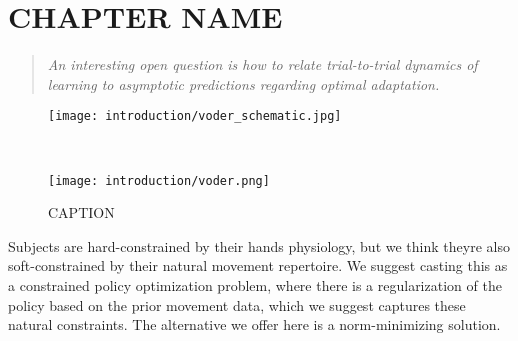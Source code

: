 \documentclass[../main.tex]{subfiles}
\begin{document}
\chapter{CHAPTER NAME}\label{chap:LABEL}

\begin{quote}
  \emph{An interesting open question is how to relate trial-to-trial dynamics of learning to asymptotic predictions regarding optimal adaptation.}\\
\end{quote}
\cleardoublepage%

\begin{figure}
    \centering
    \begin{minipage}{0.8\textwidth}
      \texttt{[image: introduction/voder\_schematic.jpg]}
      \subcaption{}
    \end{minipage}\\%
    \begin{minipage}{0.5\textwidth}
      \texttt{[image: introduction/voder.png]}
      \subcaption{}
    \end{minipage}
    \caption{CAPTION}\label{fig:voder}
  \end{figure}


Subjects are hard-constrained by their hands physiology, but we think theyre also soft-constrained by their natural movement repertoire. We suggest casting this as a constrained policy optimization problem, where there is a regularization of the policy based on the prior movement data, which we suggest captures these natural constraints. The alternative we offer here is a norm-minimizing solution.



\end{document}
